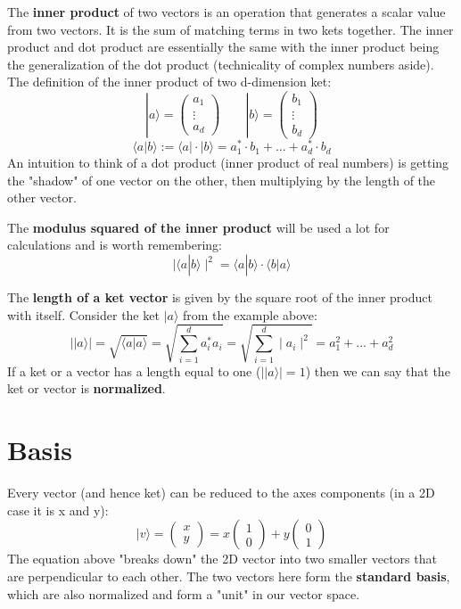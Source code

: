The \textbf{inner product} of two vectors is an operation that generates a scalar value from two vectors. It is the sum of matching terms in two kets together. The inner product and dot product are essentially the same with the inner product being the generalization of the dot product (technicality of complex numbers aside). The definition of the inner product of two d-dimension ket:
\[
    |a\rangle = \begin{pmatrix}a_1 \\ \vdots \\ a_d\end{pmatrix}
    \qquad
    |b\rangle = \begin{pmatrix}b_1 \\ \vdots \\ b_d\end{pmatrix}
\]
\begin{equation}
    \langle a|b \rangle
    := \langle a | \cdot | b \rangle
    = a^*_1 \cdot b_1 + \ldots + a^*_d \cdot b_d
\end{equation}
An intuition to think of a dot product (inner product of real numbers) is getting the "shadow" of one vector on the other, then multiplying by the length of the other vector.

The \textbf{modulus squared of the inner product} will be used a lot for calculations and is worth remembering: 
\begin{equation}
    \mid\langle a|b \rangle\mid^2
    = \langle a|b \rangle \cdot \langle b|a \rangle
\end{equation}

The \textbf{length of a ket vector} is given by the square root of the inner product with itself. Consider the ket $|a\rangle$ from the example above:
\begin{equation}
    \mid | a \rangle \mid
    = \sqrt{\langle a|a \rangle}
    = \sqrt{\sum_{i=1} ^{d} a^*_i a_i}
    = \sqrt{\sum_{i=1} ^{d} \mid a_i \mid^2}
    = a_1^2 + \ldots + a_d^2
\end{equation}
If a ket or a vector has a length equal to one ($\mid | a \rangle \mid = 1$) then we can say that the ket or vector is \textbf{normalized}.

\section{Basis}
Every vector (and hence ket) can be reduced to the axes components (in a 2D case it is x and y):
\[
    |v \rangle
    = \begin{pmatrix}x \\ y\end{pmatrix}
    = x\begin{pmatrix}1 \\ 0\end{pmatrix} + y\begin{pmatrix}0 \\ 1\end{pmatrix}
\]
The equation above "breaks down" the 2D vector into two smaller vectors that are perpendicular to each other. The two vectors here form the \textbf{standard basis}, which are also normalized and form a "unit" in our vector space.

